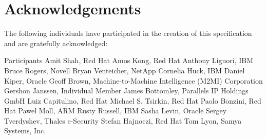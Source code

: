 \chapter{Acknowledgements}

The following individuals have participated in the creation of this specification and are gratefully acknowledged:

\begin{oasistitlesection}{Participants}
Amit Shah,	Red Hat	\newline
Amos Kong,	Red Hat	\newline
Anthony Liguori,	IBM	\newline
Bruce Rogers,	Novell	\newline
Bryan Venteicher,	NetApp	\newline
Cornelia Huck,	IBM	\newline
Daniel Kiper,	Oracle	\newline
Geoff Brown,	Machine-to-Machine Intelligence (M2MI) Corporation	\newline
Gershon Janssen,	Individual Member	\newline
James Bottomley,	Parallels IP Holdings GmbH	\newline
Luiz Capitulino,	Red Hat	\newline
Michael S. Tsirkin,	Red Hat	\newline
Paolo Bonzini,	Red Hat	\newline
Pawel Moll,	ARM \newline
Rusty Russell,	IBM	\newline
Sasha Levin,	Oracle	\newline
Sergey Tverdyshev,	Thales e-Security	\newline
Stefan Hajnoczi,	Red Hat	\newline
Tom Lyon,	Samya Systems, Inc.	\newline
\end{oasistitlesection}
